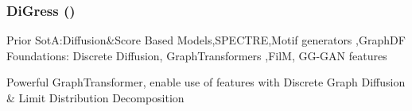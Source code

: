 \documentclass[./presentation.tex]{subfiles}
\begin{document}
\begin{frame}[t,label=digress]
  \frametitle{DiGress (\cite{vignacDiGressDiscreteDenoising2023b})}
  \vspace{-1cm}
\footnotesize
\begin{priorart}
{\footnotesize
    Prior SotA:Diffusion\&Score Based Models\citep{niuPermutationInvariantGraph2020b,songGenerativeModelingEstimating2019b},SPECTRE\citep{martinkusSPECTRESpectralConditioning2022b},Motif generators \citep{maziarzLearningExtendMolecular2021},GraphDF\citep{luoGraphDFDiscreteFlow2021d}
\\
Foundations: Discrete Diffusion\citep{austinStructuredDenoisingDiffusion2021e}, GraphTransformers \citep{vaswaniAttentionAllYou2017c,yunGraphTransformerNetworks2019b},FilM\citep{perezFiLMVisualReasoning2018b}, GG-GAN features \citep{krawczukGGGANGeometricGraph2020}
 }
  \end{priorart}
  \begin{contributions}
    Powerful GraphTransformer, enable use of features with Discrete Graph Diffusion \& Limit Distribution Decomposition 
  \end{contributions}
%
  
\end{frame}
\end{document}
